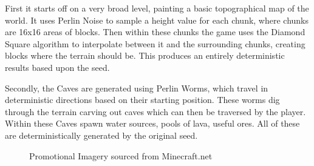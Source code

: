 \begin{flushleft}
                    \vspace{0.2cm}

                    First it starts off on a very broad level, painting a basic topographical map of the world. It uses Perlin Noise to sample
                    a height value for each chunk, where chunks are 16x16 areas of blocks. Then within these chunks the game uses the Diamond Square
                    algorithm to interpolate between it and the surrounding chunks, creating blocks where the terrain should be. This produces an 
                    entirely deterministic results based upon the seed.\\

                    \vspace{0.2cm}

                    Secondly, the Caves are generated using Perlin Worms, which travel in deterministic directions based on their starting position.
                    These worms dig through the terrain carving out caves which can then be traversed by the player. Within these Caves spawn water
                    sources, pools of lava, useful ores. All of these are deterministically generated by the original seed. \\ 


                    \begin{figure}[H]
                        \centering
                        \qquad
                        \caption*{Promotional Imagery sourced from Minecraft.net}
                    \end{figure}


\end{flushleft}
